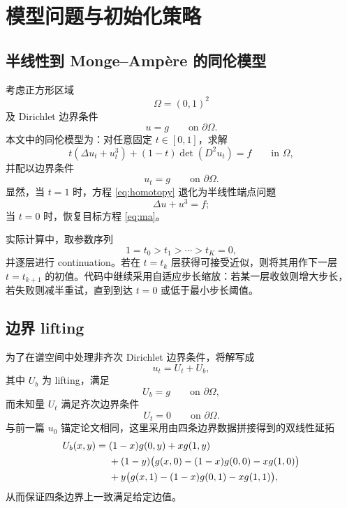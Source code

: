\documentclass[11pt,a4paper]{article}
\begin{document}
\section{模型问题与初始化策略}
\subsection{半线性到 Monge--Amp\`ere 的同伦模型}
考虑正方形区域
\[
\Omega=(0,1)^2
\]
及 Dirichlet 边界条件
\begin{equation}
u=g \qquad \text{on }\partial\Omega.
\label{eq:bc}
\end{equation}
本文中的同伦模型为：对任意固定 $t\in[0,1]$，求解
\begin{equation}
t(\Delta u_t+u_t^3)+(1-t)\det(D^2u_t)=f
\qquad \text{in }\Omega,
\label{eq:homotopy}
\end{equation}
并配以边界条件
\begin{equation}
u_t=g \qquad \text{on }\partial\Omega.
\label{eq:bc-t}
\end{equation}
显然，当 $t=1$ 时，方程 \eqref{eq:homotopy} 退化为半线性端点问题
\begin{equation}
\Delta u+u^3=f;
\label{eq:semi-endpoint}
\end{equation}
当 $t=0$ 时，恢复目标方程 \eqref{eq:ma}。

实际计算中，取参数序列
\begin{equation}
1=t_0>t_1>\cdots>t_K=0,
\label{eq:t-sequence}
\end{equation}
并逐层进行 continuation。若在 $t=t_k$ 层获得可接受近似，则将其用作下一层 $t=t_{k+1}$ 的初值。代码中继续采用自适应步长缩放：若某一层收敛则增大步长，若失败则减半重试，直到到达 $t=0$ 或低于最小步长阈值。

\subsection{边界 lifting}
为了在谱空间中处理非齐次 Dirichlet 边界条件，将解写成
\begin{equation}
u_t=U_t+U_b,
\label{eq:split}
\end{equation}
其中 $U_b$ 为 lifting，满足
\[
U_b=g \qquad \text{on }\partial\Omega,
\]
而未知量 $U_t$ 满足齐次边界条件
\[
U_t=0 \qquad \text{on }\partial\Omega.
\]
与前一篇 $u_0$ 锚定论文相同，这里采用由四条边界数据拼接得到的双线性延拓
\begin{align}
U_b(x,y)
= {} & (1-x)g(0,y)+xg(1,y) \notag \\
& +(1-y)\bigl(g(x,0)-(1-x)g(0,0)-xg(1,0)\bigr) \notag \\
& +y\bigl(g(x,1)-(1-x)g(0,1)-xg(1,1)\bigr),
\label{eq:ub}
\end{align}
从而保证四条边界上一致满足给定边值。
\end{document}

